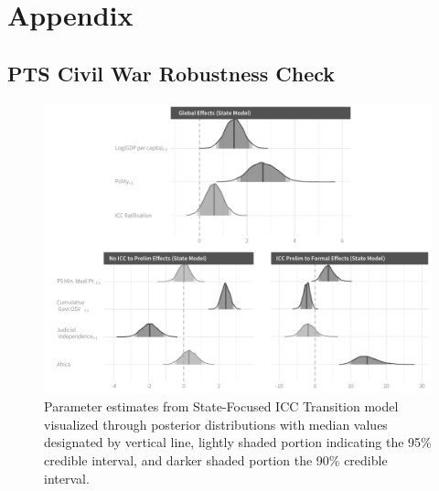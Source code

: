 \renewcommand{\thefigure}{A\arabic{figure}}
\setcounter{figure}{0}
\renewcommand{\thetable}{A.\arabic{table}}
\setcounter{table}{0}
\renewcommand{\thesection}{A.\arabic{section}}
\setcounter{section}{0}

\section*{Appendix}

\subsection*{PTS Civil War Robustness Check}

\begin{figure}
    \centering
    \includegraphics[width=1\textwidth]{stateCoefSumm_ptsCivilWarOnly.pdf}
    \caption{Parameter estimates from State-Focused ICC Transition model visualized through posterior distributions with median values designated by vertical line, lightly shaded portion indicating the 95\% credible interval, and darker shaded portion the 90\% credible interval.}
    \label{fig:stateModel}
\end{figure}

